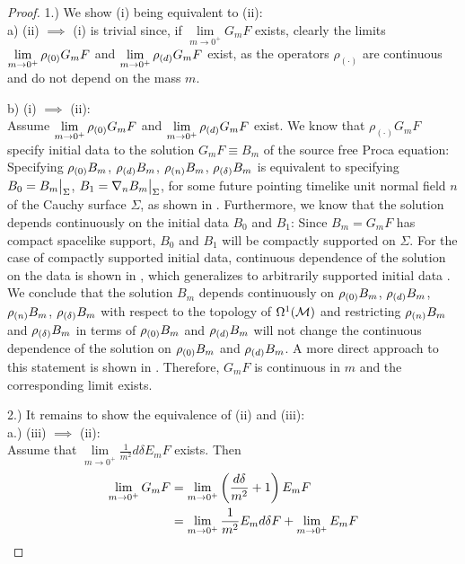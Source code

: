 \begin{proof}
1.) We show (i) being equivalent to (ii): \\
a) (ii) $\implies$ (i) is trivial since, if $\lim\limits_{m \to 0^+} G_m F$ exists, clearly the limits $\lim\limits_{m \to 0^+} \rho_{(0)} G_m F$ and  $\lim\limits_{m \to 0^+} \rho_{(d)} G_m F$ exist, as the operators $\rho_{(\cdot)}$ are continuous and do not depend on the mass $m$.  \par
b) (i) $\implies$ (ii):\\
Assume  $\lim\limits_{m \to 0^+} \rho_{(0)} G_m F$ and  $\lim\limits_{m \to 0^+} \rho_{(d)} G_m F$ exist. We know that $\rho_{(\cdot)} G_m F$ specify initial data to the solution $G_m F \equiv B_m$ of the source free Proca equation: Specifying $\rho_{(0)} B_m$, $\rho_{(d)} B_m$, $\rho_{(n)} B_m$, $\rho_{(\delta)} B_m$ is equivalent to specifying $B_0 = \restr{B_m}{\Sigma}$, $B_1 = \restr{\nabla_n B_m}{\Sigma}$, for some future pointing timelike unit normal field $n$ of the Cauchy surface $\Sigma$, as shown in \cite[pp. 2613]{FURLANI}. Furthermore, we know that the solution depends continuously on the initial data $B_0$ and $B_1$: Since $ B_m= G_m F$ has compact spacelike support, $B_0$ and $B_1$ will be compactly supported on $\Sigma$. For the case of compactly supported initial data, continuous dependence of the solution on the data is shown in \cite[Theorem 3.2.12]{baer_ginoux_pfaeffle}, which generalizes to arbitrarily supported initial data \cite[Theorem 2.3]{Sanders}.
We conclude that the solution $B_m$ depends continuously on $\rho_{(0)} B_m$, $\rho_{(d)} B_m$, $\rho_{(n)} B_m$, $\rho_{(\delta)} B_m$ with respect to the topology of $\Omega^1(\mathcal{M})$ and restricting $\rho_{(n)} B_m$ and $\rho_{(\delta)} B_m$ in terms of $\rho_{(0)} B_m$ and $\rho_{(d)} B_m$ will not change the continuous dependence of the solution on $\rho_{(0)} B_m$ and $\rho_{(d)} B_m$. A more direct approach to this statement is shown in \cite[Proposition 2.5]{pfenning}.
Therefore, $G_m F$ is continuous in $m$ and the corresponding limit exists.\par
%
%
2.) It remains to show the equivalence of (ii) and (iii):\\
	a.) (iii) $\implies$ (ii):\\ Assume that $\lim\limits_{m \to 0^+} \frac{1}{m^2}d \delta E_m F $ exists. Then
	\begin{align}
		\lim\limits_{m \to 0^+} G_m F
		&= \lim\limits_{m \to 0^+} \left( \frac{d \delta}{m^2} + 1\right) E_m F \notag\\
		&= \lim\limits_{m \to 0^+} \frac{1}{m^2}E_m d \delta  F  + \lim\limits_{m \to 0^+} E_m F
	\end{align}

\end{proof}
